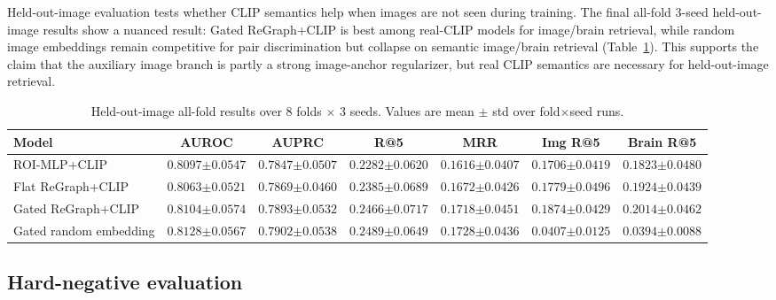 \documentclass{article}
\begin{document}
Held-out-image evaluation tests whether CLIP semantics help when images are not seen during training. The final all-fold 3-seed held-out-image results show a nuanced result: Gated ReGraph+CLIP is best among real-CLIP models for image/brain retrieval, while random image embeddings remain competitive for pair discrimination but collapse on semantic image/brain retrieval (Table~\ref{tab:heldout}). This supports the claim that the auxiliary image branch is partly a strong image-anchor regularizer, but real CLIP semantics are necessary for held-out-image retrieval.

\begin{table}[!htbp]
  \centering
  \caption{Held-out-image all-fold results over 8 folds $\times$ 3 seeds. Values are mean $\pm$ std over fold$\times$seed runs.}
  \label{tab:heldout}
  \scriptsize
  \setlength{\tabcolsep}{3.5pt}
  \renewcommand{\arraystretch}{1.15}
  \begin{tabular}{lcccccc}
    \toprule
    Model & AUROC & AUPRC & R@5 & MRR & Img R@5 & Brain R@5 \\
    \midrule
    ROI-MLP+CLIP & $0.8097{\scriptstyle\pm0.0547}$ & $0.7847{\scriptstyle\pm0.0507}$ & $0.2282{\scriptstyle\pm0.0620}$ & $0.1616{\scriptstyle\pm0.0407}$ & $0.1706{\scriptstyle\pm0.0419}$ & $0.1823{\scriptstyle\pm0.0480}$ \\
    Flat ReGraph+CLIP & $0.8063{\scriptstyle\pm0.0521}$ & $0.7869{\scriptstyle\pm0.0460}$ & $0.2385{\scriptstyle\pm0.0689}$ & $0.1672{\scriptstyle\pm0.0426}$ & $0.1779{\scriptstyle\pm0.0496}$ & $0.1924{\scriptstyle\pm0.0439}$ \\
    Gated ReGraph+CLIP & $0.8104{\scriptstyle\pm0.0574}$ & $0.7893{\scriptstyle\pm0.0532}$ & $0.2466{\scriptstyle\pm0.0717}$ & $0.1718{\scriptstyle\pm0.0451}$ & $\mathbf{0.1874{\scriptstyle\pm0.0429}}$ & $\mathbf{0.2014{\scriptstyle\pm0.0462}}$ \\
    Gated random embedding & $\mathbf{0.8128{\scriptstyle\pm0.0567}}$ & $\mathbf{0.7902{\scriptstyle\pm0.0538}}$ & $\mathbf{0.2489{\scriptstyle\pm0.0649}}$ & $\mathbf{0.1728{\scriptstyle\pm0.0436}}$ & $0.0407{\scriptstyle\pm0.0125}$ & $0.0394{\scriptstyle\pm0.0088}$ \\
    \bottomrule
  \end{tabular}
\end{table}

\subsection{Hard-negative evaluation}
\end{document}

